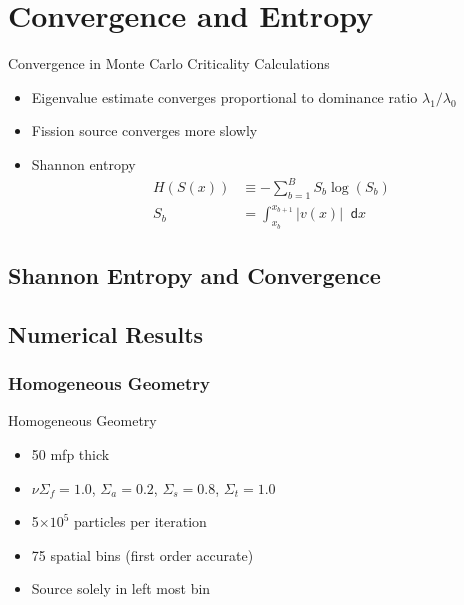\documentclass[xcolor={usenames, dvipsnames},]{beamer}
\newcommand{\dd}{\mathop{}\!\mathsf{d}}
\newcommand{\e}[1]{\ensuremath{\times 10^{#1}}}
\begin{document}
\section{Convergence and Entropy}
\begin{frame}{Convergence in Monte Carlo Criticality Calculations}
    \begin{itemize}
        \item Eigenvalue estimate converges proportional to dominance ratio $\lambda_1/\lambda_0$
        \item Fission source converges more slowly
        \item Shannon entropy
        \begin{align*}
            H\left(S(x)\right) &\equiv -\sum_{b=1}^B S_b\log\left(S_b\right) \\[0.5em]
            S_b &= \int_{x_b}^{x_{b+1}} \left|v(x)\right| \dd x
        \end{align*}
    \end{itemize}
\end{frame}

\subsection{Shannon Entropy and Convergence}
\subsection{Numerical Results}
\subsubsection{Homogeneous Geometry}
\begin{frame}{Homogeneous Geometry}
    \begin{itemize}
        \item 50 mfp thick
        \item $\nu\Sigma_f = 1.0$, $\Sigma_a = 0.2$, $\Sigma_s = 0.8$, $\Sigma_t = 1.0$
        \item 5\e{5} particles per iteration
        \item 75 spatial bins (first order accurate)
        \item Source solely in left most bin
    \end{itemize}
\end{frame}
\end{document}
